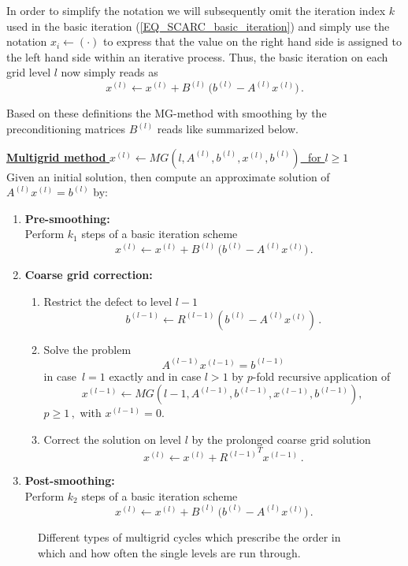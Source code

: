In order to simplify the notation we will subsequently omit the iteration index $k$ used in the basic iteration (\ref{EQ_SCARC_basic_iteration})
and simply use the notation $x_i \leftarrow (\cdot)$
to express that the value on the right hand side is assigned to the left hand side within an iterative process. Thus, the basic iteration on each grid level $l$ now simply reads as
\[ x^{(l)} \leftarrow x^{(l)} + B^{(l)}\, \big(b^{(l)} - A^{(l)} x^{(l)} \big)\,. \]

Based on these definitions the MG-method with smoothing by the preconditioning matrices $B^{(l)}$ reads like summarized below.

\newpage   %
{\underline{{\bf Multigrid method}\,\,{\boldmath $x^{(l)} \leftarrow MG(l,A^{(l)},b^{(l)},x^{(l)},b^{(l)})$}\,\, for\,\,{\boldmath $l\geq 1$}}} \mbox{} \\[1ex]
Given an initial solution, then compute an approximate solution of $A^{(l)} x^{(l)} =b^{(l)}$ by:
\begin{enumerate}
%
\item {\bf Pre-smoothing:} \\ [1ex]
Perform $k_1$ steps of a basic iteration scheme
\[ x^{(l)} \leftarrow x^{(l)} + B^{(l)}\, \big(b^{(l)} - A^{(l)} x^{(l)} \big)\,. \]
\item {\bf Coarse grid correction:}
%
\begin{enumerate}
\item Restrict the defect to level $l-1$
\[ b^{(l-1)} \leftarrow R^{(l-1)} (b^{(l)} - A^{(l)} x^{(l)} )\,. \]
\item Solve the problem
\[ A^{(l-1)} x^{(l-1)} = b^{(l-1)} \]
in case $\,l=1$ exactly and in case  $l>1$ by $p$-fold recursive application of
\[ x^{(l-1)}  \leftarrow MG(l-1,A^{(l-1)}, b^{(l-1)}, x^{(l-1)}, b^{(l-1)}),\,\]
$p \geq 1\,,$  with $x^{(l-1)}=0$.
\item Correct the solution on level $l$ by the prolonged coarse grid solution
\[ x^{(l)} \leftarrow x^{(l)} + {R^{(l-1)}}^T x^{(l-1)} \,.\]
\end{enumerate}
%
\item {\bf Post-smoothing:} \\[1ex]
Perform $k_2$ steps of a basic iteration scheme
\[ x^{(l)} \leftarrow x^{(l)} + B^{(l)}\, \big(b^{(l)} - A^{(l)} x^{(l)} \big)\,. \]
%
\end{enumerate}

\begin{figure}[htbp]
\begin{center}

\end{center}
\caption{Different types of multigrid cycles which prescribe the order in which and how often the single levels are run through.}
\label{FIG_SCARC_mg_cycle}
\end{figure}

